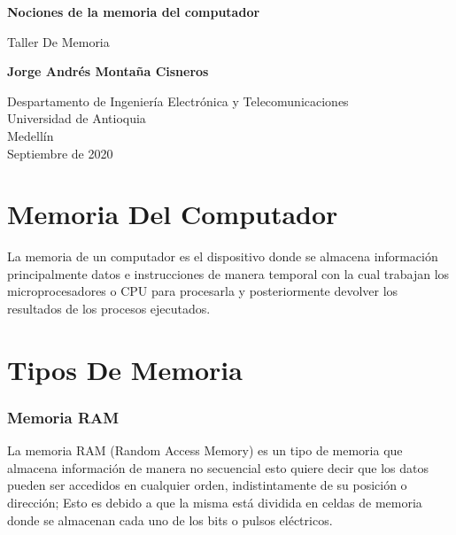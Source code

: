 \documentclass{article}
\begin{document}
\begin{titlepage}
    \begin{center}
        \vspace*{1cm}
            
        \Huge
        \textbf{Nociones de la memoria del
computador}
            
        \vspace{0.5cm}
        \LARGE
        Taller De Memoria
            
        \vspace{1.5cm}
            
        \textbf{Jorge Andrés Montaña Cisneros}
            
        \vfill
            
        \vspace{0.8cm}
            
        \Large
        Despartamento de Ingeniería Electrónica y Telecomunicaciones\\
        Universidad de Antioquia\\
        Medellín\\
        Septiembre de 2020
            
    \end{center}
\end{titlepage}

\tableofcontents

\newpage

\section{Memoria Del Computador}
La memoria de un computador es el dispositivo donde se almacena información principalmente datos e instrucciones de manera temporal con la cual trabajan los microprocesadores o CPU para procesarla y posteriormente devolver los resultados de los procesos ejecutados. \cite{augus}

\section{Tipos De Memoria} \label{contenido}

\subsubsection{Memoria RAM}
La memoria RAM (Random Access Memory) es un tipo de memoria que almacena información de manera no secuencial esto quiere decir que los datos pueden ser accedidos en cualquier orden, indistintamente de su posición o dirección; Esto es debido a que la misma está dividida en celdas de memoria donde se almacenan cada uno de los bits o pulsos eléctricos.\cite{ramwebsite}
\end{document}
